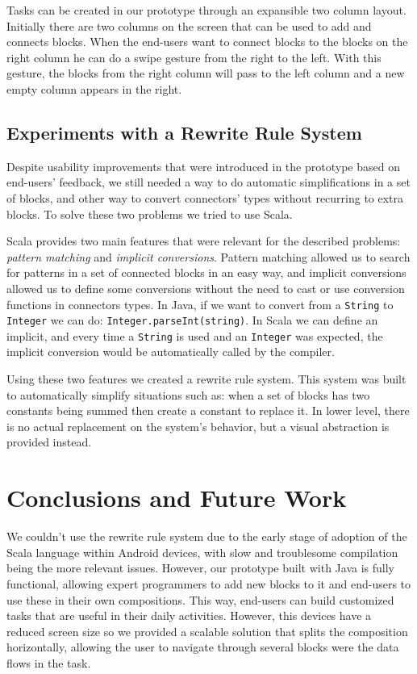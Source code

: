 \documentclass[9pt,a4paper]{extarticle}
\begin{document}
\begin{multicols}{2}
Tasks can be created in our prototype through an expansible two column layout. Initially there are two columns on the screen that can be used to add and connects blocks. When the end-users want to connect blocks to the blocks on the right column he can do a swipe gesture from the right to the left. With this gesture, the blocks from the right column will pass to the left column and a new empty column appears in the right.

\subsection{Experiments with a Rewrite Rule System}

Despite usability improvements that were introduced in the prototype based on end-users' feedback, we still needed a way to do automatic simplifications in a set of blocks, and other way to convert connectors' types without recurring
to extra blocks. To solve these two problems we tried to use Scala.

Scala provides two main features that were relevant for the described problems: \emph{pattern matching} and \emph{implicit conversions}. Pattern matching allowed us to search for patterns in a set of connected blocks in an easy way, and implicit conversions allowed us to define some conversions without the need to cast or use conversion functions in connectors types. In Java, if we want to convert from a \texttt{String} to \texttt{Integer} we can do: \texttt{Integer.parseInt(string)}. In Scala we can define an implicit,
and every time a \texttt{String} is used and an \texttt{Integer} was expected, the implicit conversion would be automatically called by the compiler.

Using these two features we created a rewrite rule system. This system was built to automatically simplify situations such as: when a set of blocks has two constants being summed then create a constant to replace it. In lower level, there is no actual replacement on the system's behavior, but a visual abstraction is provided instead. 

\section{Conclusions and Future Work}\label{sec:conclui}

We couldn't use the rewrite rule system due to the early stage of adoption of the Scala language within Android devices, with slow and troublesome compilation being the more relevant issues. However, our prototype built with Java is fully functional, allowing expert programmers to add new blocks to it and end-users to use these in their own compositions. This way, end-users can build customized tasks that are useful in their daily activities. However, this devices have a reduced screen size so we provided a scalable solution that splits the composition horizontally, allowing the user to navigate through several blocks were the data flows in the task. 


\end{multicols}
\end{document}
